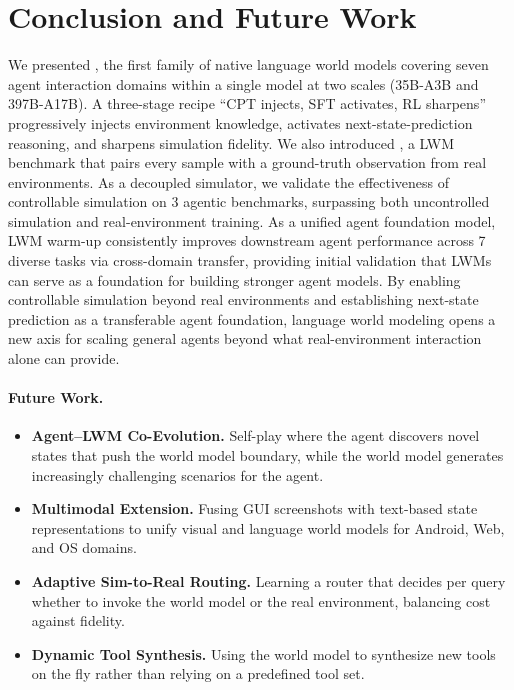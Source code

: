 \section{Conclusion and Future Work}
\label{sec:conclusion}

We presented \method, the first family of native language world models covering seven agent interaction domains within a single model at two scales (35B-A3B and 397B-A17B).
A three-stage recipe ``CPT injects, SFT activates, RL sharpens'' progressively injects environment knowledge, activates next-state-prediction reasoning, and sharpens simulation fidelity.
We also introduced \bench, a LWM benchmark that pairs every sample with a ground-truth observation from real environments.
As a decoupled simulator, we validate the effectiveness of controllable simulation on 3 agentic benchmarks, surpassing both uncontrolled simulation and real-environment training.
As a unified agent foundation model, LWM warm-up consistently improves downstream agent performance across 7 diverse tasks via cross-domain transfer, providing initial validation that LWMs can serve as a foundation for building stronger agent models.
By enabling controllable simulation beyond real environments and establishing next-state prediction as a transferable agent foundation, language world modeling opens a new axis for scaling general agents beyond what real-environment interaction alone can provide.

\paragraph{Future Work.}

\begin{itemize}[leftmargin=1.5em,itemsep=2pt]
\item \textbf{Agent--LWM Co-Evolution.} Self-play where the agent discovers novel states that push the world model boundary, while the world model generates increasingly challenging scenarios for the agent.
\item \textbf{Multimodal Extension.} Fusing GUI screenshots with text-based state representations to unify visual and language world models for Android, Web, and OS domains.
\item \textbf{Adaptive Sim-to-Real Routing.} Learning a router that decides per query whether to invoke the world model or the real environment, balancing cost against fidelity.
\item \textbf{Dynamic Tool Synthesis.} Using the world model to synthesize new tools on the fly rather than relying on a predefined tool set.
\end{itemize}
